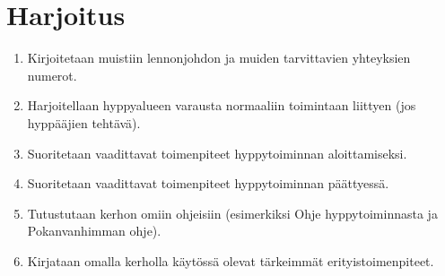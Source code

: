 \section{ Harjoitus }
\label{hyppytoiminnan-jarjestaminen-harjoitus}

\begin{enumerate}[label=\bfseries \arabic*)]
\item  Kirjoitetaan muistiin lennonjohdon ja muiden tarvittavien yhteyksien numerot. 
\item  Harjoitellaan hyppyalueen varausta normaaliin toimintaan liittyen (jos hyppääjien tehtävä). 
\item  Suoritetaan vaadittavat toimenpiteet hyppytoiminnan aloittamiseksi.  
\item  Suoritetaan vaadittavat toimenpiteet hyppytoiminnan päättyessä. 
\item  Tutustutaan kerhon omiin ohjeisiin (esimerkiksi Ohje hyppytoiminnasta ja Pokanvanhimman ohje). 
\item  Kirjataan omalla kerholla käytössä olevat tärkeimmät erityistoimenpiteet. 
\end{enumerate}
